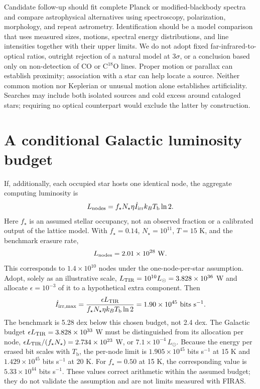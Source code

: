 \documentclass[10pt,twocolumn]{article}
\newcommand{\Iirr}{\dot I_{\mathrm{irr}}}
\newcommand{\Tb}{T_{\mathrm{b}}}
\begin{document}
Candidate follow-up should fit complete Planck or modified-blackbody
spectra and compare astrophysical alternatives using spectroscopy,
polarization, morphology, and repeat astrometry. Identification should
be a model comparison that uses measured sizes, motions, spectral energy
distributions, and line intensities together with their upper limits.
We do not adopt fixed far-infrared-to-optical ratios, outright rejection
of a natural model at $3\sigma$, or a conclusion based only on
non-detection of CO or C$^{18}$O lines. Proper motion or
parallax can establish proximity; association with a star can help
locate a source. Neither common motion nor Keplerian or unusual motion
alone establishes artificiality. Searches may include both isolated
sources and cold excess around cataloged stars; requiring no optical
counterpart would exclude the latter by construction.

\section{A conditional Galactic luminosity budget}
If, additionally, each occupied star hosts one identical node, the
aggregate computing luminosity is
\begin{equation}
L_{\rm nodes}=f_\star N_\star\eta\Iirr k_B\Tb\ln2.
\end{equation}
Here $f_\star$ is an assumed stellar occupancy, not an observed fraction
or a calibrated output of the lattice model. With $f_\star=0.14$,
$N_\star=10^{11}$, $T=15$ K, and the benchmark erasure rate,
\begin{equation}
L_{\rm nodes}=2.01\times10^{28}\ {\rm W}.
\end{equation}
This corresponds to $1.4\times10^{10}$ nodes under the one-node-per-star
assumption. Adopt, solely as an illustrative scale,
$L_{\rm TIR}=10^{10}L_\odot=3.828\times10^{36}$ W and allocate
$\epsilon=10^{-3}$ of it to a hypothetical extra component. Then
\begin{equation}
\dot I_{\mathrm{irr,max}}=\frac{\epsilon L_{\rm TIR}}
 {f_\star N_\star\eta k_B\Tb\ln2}
 =1.90\times10^{45}\ {\rm bits\ s^{-1}}.
\label{eq:budget}
\end{equation}
The benchmark is 5.28 dex below this chosen budget, not 2.4 dex.
The Galactic budget $\epsilon L_{\rm TIR}=3.828\times10^{33}$ W must
be distinguished from its allocation per node,
$\epsilon L_{\rm TIR}/(f_\star N_\star)=2.734\times10^{23}$ W, or
$7.1\times10^{-4}\,L_\odot$. Because the energy per erased bit scales
with $\Tb$, the per-node limit is $1.905\times10^{45}$ bits s$^{-1}$
at 15 K and $1.429\times10^{45}$ bits s$^{-1}$ at 20 K.
For $f_\star=0.50$ at 15 K, the corresponding value is
$5.33\times10^{44}$ bits s$^{-1}$. These values correct arithmetic
within the assumed budget; they do not validate the assumption and are
not limits measured with FIRAS.
\end{document}
